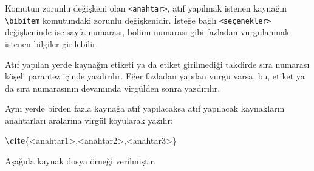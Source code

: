 \documentclass[
  10pt,
]{scrbook}
\newenvironment{Shaded}{\begin{snugshade}}{\end{snugshade}}
\newcommand{\ExtensionTok}[1]{#1}
\newcommand{\KeywordTok}[1]{\textcolor[rgb]{0.13,0.29,0.53}{\textbf{#1}}}
\newcommand{\NormalTok}[1]{#1}
\theoremstyle{definition}
\theoremstyle{definition}
\theoremstyle{definition}
\theoremstyle{definition}
\theoremstyle{remark}
\begin{document}
Komutun zorunlu değişkeni olan \texttt{\textless{}anahtar\textgreater{}}, atıf yapılmak istenen kaynağın \texttt{\textbackslash{}bibitem} komutundaki zorunlu değişkenidir. İsteğe bağlı \texttt{\textless{}seçenekler\textgreater{}} değişkeninde ise sayfa numarası, bölüm numarası gibi fazladan vurgulanmak istenen bilgiler girilebilir.

Atıf yapılan yerde kaynağın etiketi ya da etiket girilmediği takdirde sıra numarası köşeli parantez içinde yazdırılır. Eğer fazladan yapılan vurgu varsa, bu, etiket ya da sıra numarasının devamında virgülden sonra yazdırılır.

Aynı yerde birden fazla kaynağa atıf yapılacaksa atıf yapılacak kaynakların anahtarları aralarına virgül koyularak yazılır:

\begin{Shaded}
\begin{Highlighting}[]
\KeywordTok{\textbackslash{}cite}\NormalTok{\{}\ExtensionTok{\textless{}anahtar1\textgreater{},\textless{}anahtar2\textgreater{},\textless{}anahtar3\textgreater{}}\NormalTok{\}}
\end{Highlighting}
\end{Shaded}

Aşağıda kaynak dosya örneği verilmiştir.
\end{document}

